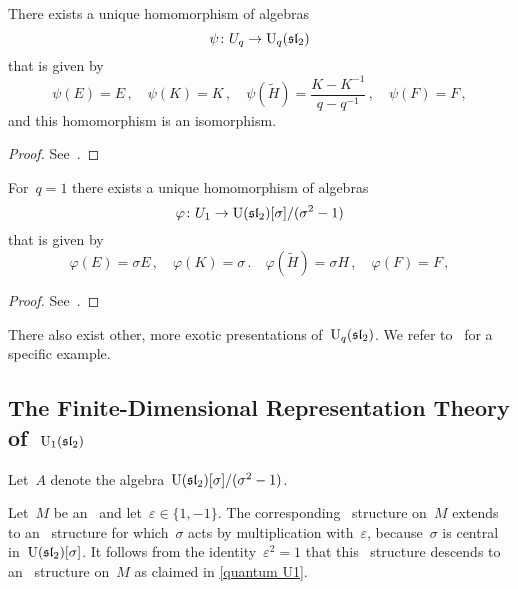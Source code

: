\documentclass[a4paper, 11pt, oneside]{scrartcl}
\begin{document}
\begin{proposition}
  There exists a unique homomorphism of algebras
  \[
    \psi
    \colon
    U_q
    \to
    \operatorname{U}_q(\mathfrak{sl}_2)
  \]
  that is given by
  \[
    \psi(E) = E \,,
    \quad
    \psi(K) = K \,,
    \quad
    \psi(\widetilde{H}) = \frac{K - K^{-1}}{q - q^{-1}} \,,
    \quad
    \psi(F) = F \,,
  \]
  and this homomorphism is an isomorphism.
\end{proposition}

\begin{proof}
 See~{\cite[Proposition~VI.2.1]{kassel_quantum}}.
\end{proof}

\begin{proposition}
  For~$q = 1$ there exists a unique homomorphism of algebras
  \[
    \varphi
    \colon
    U_1
    \to
    \operatorname{U}(\mathfrak{sl}_2)[\sigma]/(\sigma^2 - 1)
  \]
  that is given by
  \[
    \varphi(E) = \sigma E \,,
    \quad
    \varphi(K) = \sigma \,.
    \quad
    \varphi(\widetilde{H}) = \sigma H \,,
    \quad
    \varphi(F) = F \,,
  \]
\end{proposition}

\begin{proof}
  See~\cite[Proof of Proposition~VI.2.2]{kassel_quantum}.
\end{proof}

\begin{remark}
  There also exist other, more exotic presentations of~$\operatorname{U}_q(\mathfrak{sl}_2)$.
  We refer to~\cite{equitable_presentation} for a specific example.
\end{remark}




\subsection{The Finite-Dimensional Representation Theory of~\texorpdfstring{$\operatorname{U}_1(\mathfrak{sl}_2)$}{U1(sl2)}}
\label{representation theory of U1}

Let~$A$ denote the algebra~$\operatorname{U}(\mathfrak{sl}_2)[\sigma]/(\sigma^2 - 1)$.

Let~$M$ be an~ and let~$\varepsilon \in \{ 1, -1 \}$.
The corresponding~ structure on~$M$ extends to an~ structure for which~$\sigma$ acts by multiplication with~$\varepsilon$, because~$\sigma$ is central in~$\operatorname{U}(\mathfrak{sl}_2)[\sigma]$.
It follows from the identity~$\varepsilon^2 = 1$ that this~ structure descends to an~ structure on~$M$ as claimed in \cref{quantum U1}.
\end{document}
